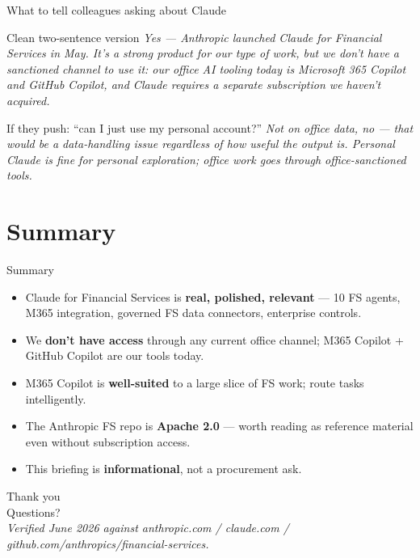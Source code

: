 \documentclass[11pt,aspectratio=169]{beamer}
\newcommand{\hl}[1]{\textbf{\textcolor{accentpurple}{#1}}}
\begin{document}
\begin{frame}{What to tell colleagues asking about Claude}
  \begin{exampleblock}{Clean two-sentence version}
    \textit{Yes --- Anthropic launched Claude for Financial Services in May. It's a strong product for our type of work, but we don't have a sanctioned channel to use it: our office AI tooling today is Microsoft 365 Copilot and GitHub Copilot, and Claude requires a separate subscription we haven't acquired.}
  \end{exampleblock}

  \vfill
  \begin{block}{If they push: ``can I just use my personal account?''}
    \textit{Not on office data, no --- that would be a data-handling issue regardless of how useful the output is. Personal Claude is fine for personal exploration; office work goes through office-sanctioned tools.}
  \end{block}
\end{frame}

\section{Summary}

\begin{frame}{Summary}
  \begin{itemize}
    \item Claude for Financial Services is \hl{real, polished, relevant} --- 10 FS agents, M365 integration, governed FS data connectors, enterprise controls.
    \item We \hl{don't have access} through any current office channel; M365 Copilot + GitHub Copilot are our tools today.
    \item M365 Copilot is \textbf{well-suited} to a large slice of FS work; route tasks intelligently.
    \item The Anthropic FS repo is \textbf{Apache 2.0} --- worth reading as reference material even without subscription access.
    \item This briefing is \textbf{informational}, not a procurement ask.
  \end{itemize}
\end{frame}

\begin{frame}[plain]
  \begin{center}
    {\Huge Thank you}\\[1.2em]
    {\Large Questions?}\\[2.4em]
    \small \textit{Verified June 2026 against anthropic.com / claude.com / github.com/anthropics/financial-services.}
  \end{center}
\end{frame}
\end{document}
